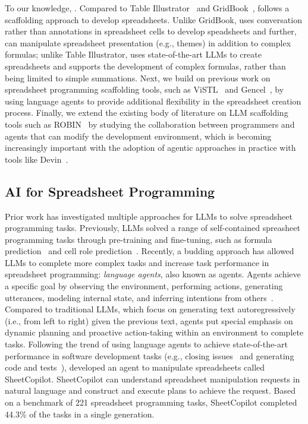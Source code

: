 To our knowledge, .
Compared to Table Illustrator~\cite{huang2024table} and GridBook~\cite{srinivasa2022gridbook}, \tool follows a scaffolding approach to develop spreadsheets. 
Unlike GridBook, \tool uses conversation rather than annotations in spreadsheet cells to develop speadsheets and further, can manipulate spreadsheet presentation (e.g., themes) in addition to complex formulas; unlike Table Illustrator, \tool uses state-of-the-art LLMs to create spreadsheets and supports the development of complex formulas, rather than being limited to simple summations.
Next, we build on previous work on spreadsheet programming scaffolding tools, such as ViSTL~\cite{abraham2005visual} and Gencel~\cite{erwig2006gencel}, by using language agents to provide additional flexibility in the spreadsheet creation process.
Finally, we extend the existing body of literature on LLM scaffolding tools such as ROBIN~\cite{bajpai2024lets} by studying the collaboration between programmers and agents that can modify the development environment, which is becoming increasingly important with the adoption of agentic approaches in practice with tools like Devin~\cite{devin2025devin}. 

\subsection{AI for Spreadsheet Programming}
\label{sec:llm-agents}
Prior work has investigated multiple approaches for LLMs to solve spreadsheet programming tasks.
Previously, LLMs solved a range of self-contained spreasheet programming tasks through pre-training and fine-tuning, such as formula prediction~\cite{joshi2024flame, chen2021spreadsheetcoder} and cell role prediction~\cite{du2021tabularnet}.
Recently, a budding approach has allowed LLMs to complete more complex tasks and increase task performance in spreadsheet programming: \emph{language agents}, also known as agents.
Agents achieve a specific goal by observing the environment, performing actions, generating utterances, modeling internal state, and inferring intentions from others~\cite{andreas2022language, xi2023rise, wang2024survey}.
Compared to traditional LLMs, which focus on generating text autoregressively (i.e., from left to right) given the previous text, agents put special emphasis on dynamic planning and proactive action-taking within an environment to complete tasks.
Following the trend of using language agents to achieve state-of-the-art performance in software development tasks (e.g., closing issues~\cite{yang2024swe} and generating code and tests~\cite{tufano2024autodev}), \citet{li2024sheetcopilot} developed an agent to manipulate spreadsheets called SheetCopilot. 
SheetCopilot can understand spreadsheet manipulation requests in natural language and construct and execute plans to achieve the request.
Based on a benchmark of 221 spreadsheet programming tasks, SheetCopilot completed 44.3\% of the tasks in a single generation.

